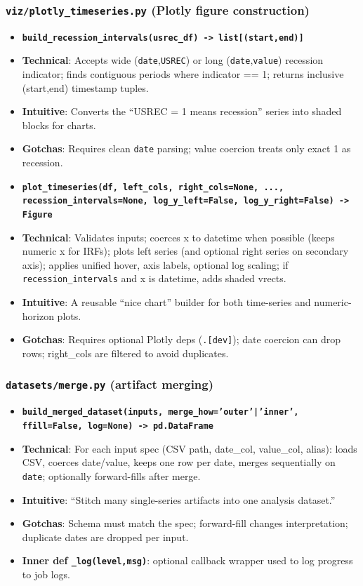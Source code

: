 \documentclass[11pt]{article}
\begin{document}
\subsubsection{\texttt{viz/plotly\_timeseries.py} (Plotly figure construction)}

\begin{itemize}[leftmargin=*,nosep]
\item \textbf{\texttt{build\_recession\_intervals(usrec\_df) -> list[(start,end)]}}
\item \textbf{Technical}: Accepts wide (\texttt{date},\texttt{USREC}) or long (\texttt{date},\texttt{value}) recession indicator; finds contiguous periods where indicator == 1; returns inclusive (start,end) timestamp tuples.
\item \textbf{Intuitive}: Converts the “USREC = 1 means recession” series into shaded blocks for charts.
\item \textbf{Gotchas}: Requires clean \texttt{date} parsing; value coercion treats only exact 1 as recession.
\item \textbf{\texttt{plot\_timeseries(df, left\_cols, right\_cols=None, ..., recession\_intervals=None, log\_y\_left=False, log\_y\_right=False) -> Figure}}
\item \textbf{Technical}: Validates inputs; coerces x to datetime when possible (keeps numeric x for IRFs); plots left series (and optional right series on secondary axis); applies unified hover, axis labels, optional log scaling; if \texttt{recession\_intervals} and x is datetime, adds shaded vrects.
\item \textbf{Intuitive}: A reusable “nice chart” builder for both time-series and numeric-horizon plots.
\item \textbf{Gotchas}: Requires optional Plotly deps (\texttt{.[dev]}); date coercion can drop rows; right\_cols are filtered to avoid duplicates.
\end{itemize}


\subsubsection{\texttt{datasets/merge.py} (artifact merging)}

\begin{itemize}[leftmargin=*,nosep]
\item \textbf{\texttt{build\_merged\_dataset(inputs, merge\_how='outer'|'inner', ffill=False, log=None) -> pd.DataFrame}}
\item \textbf{Technical}: For each input spec (CSV path, date\_col, value\_col, alias): loads CSV, coerces date/value, keeps one row per date, merges sequentially on \texttt{date}; optionally forward-fills after merge.
\item \textbf{Intuitive}: “Stitch many single-series artifacts into one analysis dataset.”
\item \textbf{Gotchas}: Schema must match the spec; forward-fill changes interpretation; duplicate dates are dropped per input.
\item \textbf{Inner def \texttt{\_log(level,msg)}}: optional callback wrapper used to log progress to job logs.
\end{itemize}
\end{document}
